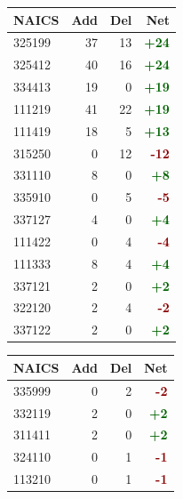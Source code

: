 \documentclass[11pt]{article}
\begin{document}
\begin{table}[H]
\centering
\begin{minipage}{0.48\textwidth}
\centering
{}
\begin{tabular}{lrrr}
\toprule
\textbf{NAICS} & \textbf{Add} & \textbf{Del} & \textbf{Net} \\
\midrule
325199 & 37 & 13 & \textcolor{darkgreen}{\textbf{+24}} \\
325412 & 40 & 16 & \textcolor{darkgreen}{\textbf{+24}} \\
334413 & 19 & 0 & \textcolor{darkgreen}{\textbf{+19}} \\
111219 & 41 & 22 & \textcolor{darkgreen}{\textbf{+19}} \\
111419 & 18 & 5 & \textcolor{darkgreen}{\textbf{+13}} \\
315250 & 0 & 12 & \textcolor{darkred}{\textbf{-12}} \\
331110 & 8 & 0 & \textcolor{darkgreen}{\textbf{+8}} \\
335910 & 0 & 5 & \textcolor{darkred}{\textbf{-5}} \\
337127 & 4 & 0 & \textcolor{darkgreen}{\textbf{+4}} \\
111422 & 0 & 4 & \textcolor{darkred}{\textbf{-4}} \\
111333 & 8 & 4 & \textcolor{darkgreen}{\textbf{+4}} \\
337121 & 2 & 0 & \textcolor{darkgreen}{\textbf{+2}} \\
322120 & 2 & 4 & \textcolor{darkred}{\textbf{-2}} \\
337122 & 2 & 0 & \textcolor{darkgreen}{\textbf{+2}} \\
\bottomrule
\end{tabular}
\end{minipage}
\hfill
\begin{minipage}{0.48\textwidth}
\centering
{}
\begin{tabular}{lrrr}
\toprule
\textbf{NAICS} & \textbf{Add} & \textbf{Del} & \textbf{Net} \\
\midrule
335999 & 0 & 2 & \textcolor{darkred}{\textbf{-2}} \\
332119 & 2 & 0 & \textcolor{darkgreen}{\textbf{+2}} \\
311411 & 2 & 0 & \textcolor{darkgreen}{\textbf{+2}} \\
324110 & 0 & 1 & \textcolor{darkred}{\textbf{-1}} \\
113210 & 0 & 1 & \textcolor{darkred}{\textbf{-1}} \\

\end{tabular}
\end{minipage}
\end{table}
\end{document}
